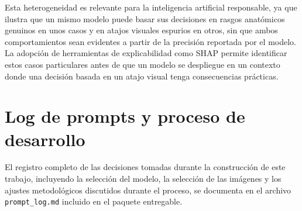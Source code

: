 \documentclass[11pt]{article}
\begin{document}
Esta heterogeneidad es relevante para la inteligencia artificial responsable, ya que ilustra que un mismo modelo puede basar sus decisiones en rasgos anatómicos genuinos en unos casos y en atajos visuales espurios en otros, sin que ambos comportamientos sean evidentes a partir de la precisión reportada por el modelo. La adopción de herramientas de explicabilidad como SHAP permite identificar estos casos particulares antes de que un modelo se despliegue en un contexto donde una decisión basada en un atajo visual tenga consecuencias prácticas.

\section*{Log de prompts y proceso de desarrollo}

El registro completo de las decisiones tomadas durante la construcción de este trabajo, incluyendo la selección del modelo, la selección de las imágenes y los ajustes metodológicos discutidos durante el proceso, se documenta en el archivo \texttt{prompt\_log.md} incluido en el paquete entregable.



\end{document}
